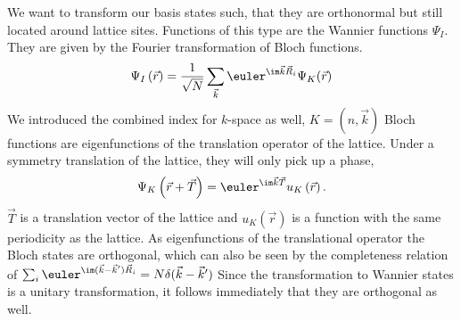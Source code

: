 We want to transform our basis states such, that they are orthonormal but still located around lattice sites.
Functions of this type are the Wannier functions $\Psi_I$. They are given by the Fourier transformation of Bloch functions.
\begin{equation}
 \Psi_I \left( \vec{r} \right) = \frac1{\sqrt{N}} \sum_{\vec{k}} \euler^{\im \vec{k}\vec{R}_i } \Psi_K(\vec r) 
\end{equation}
We introduced the combined index for $k$-space as well, $K=(n,\vec k)$
Bloch functions are eigenfunctions of the translation operator of the lattice. 
Under a symmetry translation of the lattice, they will only pick up a phase,
\begin{equation}
 \Psi_{K} \left( \vec{r}+\vec{T}\right) = \euler^{\im \vec{k} \vec{T} } u_{K} \left( \vec{r} \right). \label{BlochDef}
\end{equation}
$\vec T$ is a translation vector of the lattice and $u_{K} \left( \vec{r} \right)$ is a function with the same periodicity as the lattice. 
As eigenfunctions of the translational operator the Bloch states are orthogonal, 
which can also be seen by the completeness relation of $\sum_i \euler^{\im ( \vec k - \vec k^{\prime} ) \vec R_i} = N\delta (\vec k - \vec k^{\prime})$
Since the transformation to Wannier states is a unitary transformation, it follows immediately that they are orthogonal as well.

